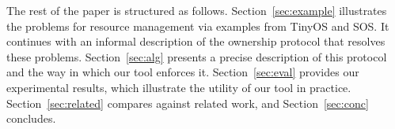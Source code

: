 The rest of the paper is structured as follows.  
%
Section~\ref{sec:example} illustrates the problems for resource management
via examples from TinyOS and SOS.  
%
It continues with an informal description of the ownership protocol that
resolves these problems.  
%
Section~\ref{sec:alg} presents a precise description of this protocol and
the way in which our tool enforces it.  
%
Section~\ref{sec:eval} provides our experimental results, which illustrate
the utility of our tool in practice.  
%
Section~\ref{sec:related} compares against related work, and
Section~\ref{sec:conc} concludes.



